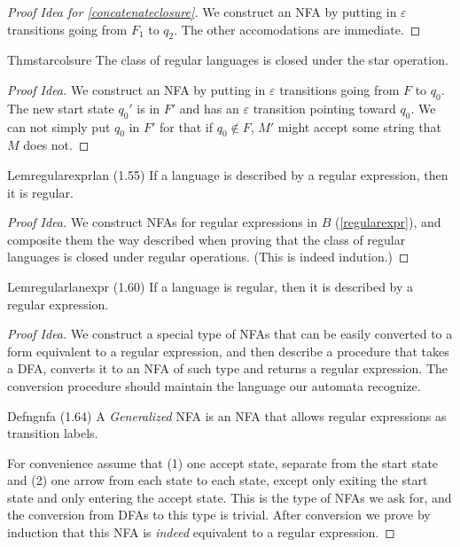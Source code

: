 \begin{proof}[Proof Idea for \ref{concatenateclosure}]
  We construct an NFA by putting in $\varepsilon$ transitions going from $F_1$ to $q_2$. The other accomodations are immediate.
\end{proof}

\begin{reference}{Thm}{starcolsure}
  The class of regular languages is closed under the star operation.
\end{reference}

\begin{proof}[Proof Idea]
  We construct an NFA by putting in $\varepsilon$ transitions going from $F$ to $q_0$. The new start state $q_0'$ is in $F'$ and has an $\varepsilon$ transition pointing toward $q_0$. We can not simply put $q_0$ in $F'$ for that if $q_0\notin F$, $M'$ might accept some string that $M$ does not.
\end{proof}

\begin{reference}{Lem}{regularexprlan}
  (1.55) If a language is described by a regular expression, then it is regular.
\end{reference}

\begin{proof}[Proof Idea]
  We construct NFAs for regular expressions in $B$ (\ref{regularexpr}), and composite them the way described when proving that the class of regular languages is closed under regular operations. (This is indeed indution.)
\end{proof}

\begin{reference}{Lem}{regularlanexpr}
  (1.60) If a language is regular, then it is described by a regular expression.
\end{reference}

\begin{proof}[Proof Idea]
  We construct a special type of NFAs that can be easily converted to a form equivalent to a regular expression, and then describe a procedure that takes a DFA, converts it to an NFA of such type and returns a regular expression. The conversion procedure should maintain the language our automata recognize.
  \begin{reference}{Defn}{gnfa}
    (1.64) A \textit{Generalized} NFA is an NFA that allows regular expressions as transition labels.
  \end{reference}
  For convenience assume that (1) one accept state, separate from the start state and (2) one arrow from each state to each state, except only exiting the start state and only entering the accept state. This is the type of NFAs we ask for, and the conversion from DFAs to this type is trivial. After conversion we prove by induction that this NFA is \textit{indeed} equivalent to a regular expression.
\end{proof}

